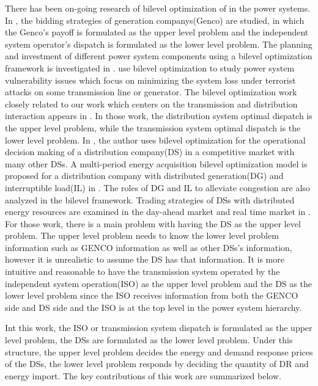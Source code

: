 There has been on-going research of bilevel optimization of in the power systems. In \cite{vahidinasab2009multiobjective,soleymani2008new,kozanidis2013mixed,zhang2011competitive,andrianesis2011mixed}, the bidding strategies of generation companys(Genco) are studied, in which the Genco's payoff is formulated as the upper level problem and the independent system operator's dispatch is formulated as the lower level problem. The planning and investment of different power system components using a bilevel optimization framework is investigated in \cite{verma2018information, zolfaghari2018bilevel, pandvzic2018investments, zhou2011designing, baringo2011wind}. \cite{yuan2011modeling, xiang2017coordinated, arroyo2009genetic, pinar2010optimization,arroyo2010bilevel} use bilevel optimization to study power system vulnerability issues which focus on minimizing the system loss under terrorist attacks on some transmission line or generator. The bilevel optimization work closely related to our work which centers on the transmission and distribution interaction appears in \cite{haghighat2012bilevel, li2007multiperiod, zhang2016trading}. In those work,  the distribution system optimal dispatch is the upper level problem, while the transmission system optimal dispatch is the lower level problem.  In \cite{haghighat2012bilevel}, the author uses bilevel optimization for the operational decision making of a distribution company(DS) in a competitive market with many other DSs.  A multi-period energy acquisition bilevel optimization model is proposed for a distribution company with distributed generation(DG) and interruptible load(IL) in \cite{li2007multiperiod}. The roles of DG and IL to alleviate congestion are also analyzed in the bilevel framework.  Trading strategies of DSs with distributed energy resources are examined in the day-ahead market and real time market in \cite{zhang2016trading}. For those work, there is a main problem with having the DS as the upper level problem. The upper level problem needs to know the lower level problem information such as GENCO information as well as other DSs's information, however it is unrealistic to assume the DS has that information. It is more intuitive and reasonable to have the transmission system operated by the independent system operation(ISO) as the upper level problem and the DS as the lower level problem since the ISO receives information from both the GENCO side and DS side and the ISO is at the top level in the power system hierarchy.

Int this work, the ISO or transmission system dispatch is formulated as the upper level problem, the DSs are formulated as the lower level problem. Under this structure, the upper level problem decides the energy and demand response prices of the DSs, the lower level problem responds by deciding the quantity of DR and energy import. The key contributions of this work are summarized below.

